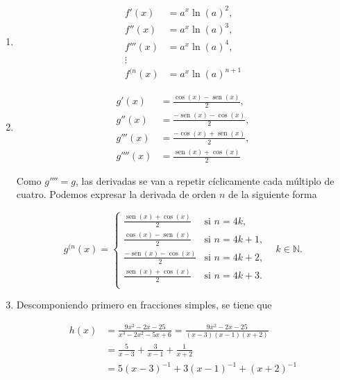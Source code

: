 \documentclass[
  spanish,
  a4paper,
]{scrreport}
\theoremstyle{definition}
\theoremstyle{remark}
\begin{document}
\begin{tcolorbox}[enhanced jigsaw, arc=.35mm, bottomrule=.15mm, bottomtitle=1mm, breakable, colback=white, colbacktitle=quarto-callout-tip-color!10!white, colframe=quarto-callout-tip-color-frame, coltitle=black, left=2mm, leftrule=.75mm, opacityback=0, opacitybacktitle=0.6, rightrule=.15mm, title=\textcolor{quarto-callout-tip-color}{\faLightbulb}\hspace{0.5em}{Solución}, titlerule=0mm, toprule=.15mm, toptitle=1mm]

\begin{enumerate}
\def\labelenumi{\alph{enumi}.}
\item
  \begin{align*}
   f'(x) &= a^x\ln(a)^2,\\ 
   f''(x) &= a^x\ln(a)^3,\\ 
   f'''(x) &= a^x\ln(a)^4,\\ 
   \vdots \\ 
   f^{(n}(x) &= a^x\ln(a)^{n+1}
   \end{align*}
\item
  \begin{align*}
   g'(x) &= \frac{\cos(x)-\operatorname{sen}(x)}{2},\\ 
   g''(x) &= \frac{-\operatorname{sen}(x)-\cos(x)}{2},\\ 
   g'''(x) &= \frac{-\cos(x)+\operatorname{sen}(x)}{2},\\ 
   g''''(x) &= \frac{\operatorname{sen}(x)+\cos(x)}{2}
   \end{align*}

  Como \(g'''' = g\), las derivadas se van a repetir cíclicamente cada
  múltiplo de cuatro. Podemos expresar la derivada de orden \(n\) de la
  siguiente forma

  \[
   g^{(n}(x)=
   \begin{cases}
   \frac{\operatorname{sen}(x) + \cos(x)}{2} & \mbox{si $n=4k$,}\\
   \frac{\cos(x)-\operatorname{sen}(x)}{2} & \mbox{si $n=4k+1$,}\\
   \frac{-\operatorname{sen}(x)-\cos(x)}{2} & \mbox{si $n=4k+2$,}\\
   \frac{\operatorname{sen}(x)+\cos(x)}{2} & \mbox{si $n=4k+3$.}\\
   \end{cases}
   \quad k\in\mathbb{N}.
   \]
\item
  Descomponiendo primero en fracciones simples, se tiene que

  \begin{align*}
   h(x) &= \frac{9x^2-2x-25}{x^3-2x^2-5x+6} = \frac{9x^2-2x-25}{(x-3)(x-1)(x+2)} \\ 
   &= \frac{5}{x-3}+\frac{3}{x-1}+\frac{1}{x+2} \\ 
   &= 5(x-3)^{-1}+3(x-1)^{-1}+(x+2)^{-1}
   \end{align*}


\end{enumerate}
\end{tcolorbox}
\end{document}
